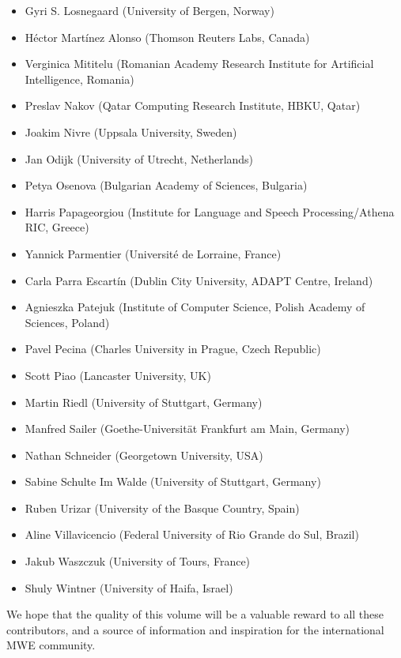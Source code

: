 \documentclass[output=paper,
modfonts,
]{langscibook}
\begin{document}
\begin{itemize}
\item Gyri S. Losnegaard (University of Bergen, Norway)
\item Héctor Martínez Alonso (Thomson Reuters Labs, Canada)
\item Verginica Mititelu (Romanian Academy Research Institute for Artificial Intelligence, Romania)
\item Preslav Nakov (Qatar Computing Research Institute, HBKU, Qatar)
\item Joakim Nivre (Uppsala University, Sweden)
\item Jan Odijk (University of Utrecht, Netherlands)
\item Petya Osenova (Bulgarian Academy of Sciences, Bulgaria)
\item Harris Papageorgiou (Institute for Language and Speech Processing/Athena RIC, Greece)
\item Yannick Parmentier (Université de Lorraine, France)
\item Carla Parra Escartín (Dublin City University, ADAPT Centre, Ireland)
\item Agnieszka Patejuk (Institute of Computer Science, Polish Academy of Sciences, Poland)
\item Pavel Pecina (Charles University in Prague, Czech Republic)
\item Scott Piao (Lancaster University, UK)
\item Martin Riedl (University of Stuttgart, Germany)
\item Manfred Sailer (Goethe-Universität Frankfurt am Main, Germany)
\item Nathan Schneider (Georgetown University, USA)
\item Sabine Schulte Im Walde (University of Stuttgart, Germany)
\item Ruben Urizar (University of the Basque Country, Spain)
\item Aline Villavicencio (Federal University of Rio Grande do Sul, Brazil)
\item Jakub Waszczuk (University of Tours, France)
\item Shuly Wintner (University of Haifa, Israel)
\end{itemize}

We hope that the quality of this volume will be a valuable reward to all these contributors, and a source of information and inspiration for the international MWE community.
\end{document}
